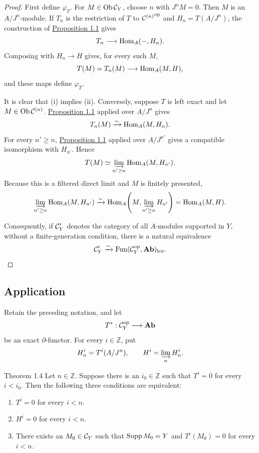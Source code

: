 \begin{proof}
First define $\varphi_T$. For $M\in\operatorname{Ob}\mathcal C_Y$, choose $n$ with $J^nM=0$.
Then $M$ is an $A/J^n$-module. If $T_n$ is the restriction of $T$ to
${\mathcal C^{(n)}}^{\mathrm{op}}$ and $H_n=T(A/J^n)$, the construction of
\hyperref[IV.1.1]{Proposition 1.1} gives
\[
  T_n\longrightarrow\operatorname{Hom}_A(-,H_n).
\]
Composing with $H_n\to H$ gives, for every such $M$,
\[
  T(M)=T_n(M)\longrightarrow\operatorname{Hom}_A(M,H),
\]
and these maps define $\varphi_T$.

It is clear that (i) implies (ii). Conversely, suppose $T$ is left exact and
let $M\in\operatorname{Ob}\mathcal C^{(n)}$. \hyperref[IV.1.1]{Proposition 1.1} applied over $A/J^n$ gives
\[
  T_n(M)\xrightarrow{\sim}\operatorname{Hom}_A(M,H_n).
\]
For every $n'\ge n$, \hyperref[IV.1.1]{Proposition 1.1} applied over $A/J^{n'}$ gives a
compatible isomorphism with $H_{n'}$. Hence
\[
  T(M)\simeq\varinjlim_{n'\ge n}\operatorname{Hom}_A(M,H_{n'}).
\]
Because this is a filtered direct limit and $M$ is finitely presented,
\[
  \varinjlim_{n'\ge n}\operatorname{Hom}_A(M,H_{n'})
  \xrightarrow{\sim}
  \operatorname{Hom}_A\!\left(M,\varinjlim_{n'\ge n}H_{n'}\right)
  =\operatorname{Hom}_A(M,H).
\]

Consequently, if $\mathcal C'_Y$ denotes the category of all $A$-modules supported
in $Y$, without a finite-generation condition, there is a natural equivalence
\[
  \mathcal C'_Y\xrightarrow{\sim}
  \operatorname{Fun}(\mathcal C_Y^{\mathrm{op}},\mathbf{Ab})_{\mathrm{lex}}.
\]
\end{proof}

\subsection*{Application}

Retain the preceding notation, and let
\[
  T^*:\mathcal C_Y^{\mathrm{op}}\longrightarrow\mathbf{Ab}
\]
be an exact $\partial$-functor. For every $i\in\mathbb Z$, put
\[
  H_n^i=T^i(A/J^n),\qquad H^i=\varinjlim_n H_n^i.
\]

\begin{sgastatement}{Theorem 1.4}
Let $n\in\mathbb Z$. Suppose there is an $i_0\in\mathbb Z$ such that
$T^i=0$ for every $i<i_0$. Then the following three conditions are equivalent:
\begin{enumerate}[label=\textup{\roman*)},leftmargin=2.7em]
\item $T^i=0$ for every $i<n$.
\item $H^i=0$ for every $i<n$.
\item There exists an $M_0\in\mathcal C_Y$ such that $\operatorname{Supp} M_0=Y$ and
$T^i(M_0)=0$ for every $i<n$.
\end{enumerate}
\end{sgastatement}


